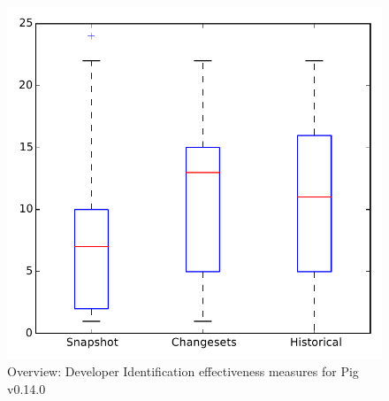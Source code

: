
\begin{figure}
\centering
\includegraphics[height=0.4\textheight]{figures/dit/all_pig}
\caption{Overview: Developer Identification effectiveness measures for Pig v0.14.0}
\label{fig:dit:all:pig}
\end{figure}
